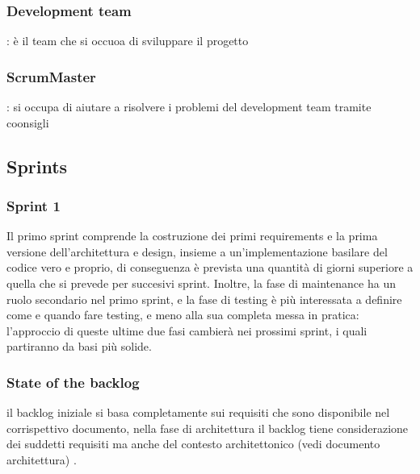 \documentclass{article}
\begin{document}
\subsubsection{Development team}: è il team che si occuoa di sviluppare il progetto 
\subsubsection{ScrumMaster}: si occupa di aiutare a risolvere i problemi del development team tramite coonsigli

\subsection{Sprints} 
\subsubsection{Sprint 1}
Il primo sprint comprende la costruzione dei primi requirements e la prima versione dell’architettura e design, insieme a un’implementazione basilare del codice vero e proprio, di conseguenza è prevista una quantità di giorni superiore a quella che si prevede per succesivi sprint. Inoltre, la fase di maintenance ha un ruolo secondario nel primo sprint, e la fase di testing è più interessata a definire come e quando fare testing, e meno alla sua completa messa in pratica: l’approccio di queste ultime due fasi cambierà nei prossimi sprint, i quali partiranno da basi più solide. 
\subsubsection{State of the backlog}
il backlog iniziale si basa completamente sui requisiti che sono disponibile nel corrispettivo documento, nella fase di architettura il backlog tiene considerazione dei suddetti requisiti ma anche del contesto architettonico (vedi documento architettura) . 
\end{document}
